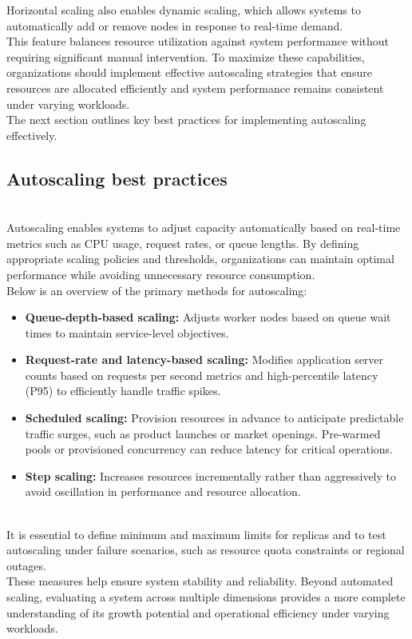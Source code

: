 Horizontal scaling also enables dynamic scaling, which allows systems to automatically add or remove nodes in response to real-time demand.
\\
This feature balances resource utilization against system performance without requiring significant manual intervention. To maximize these capabilities, organizations should implement effective autoscaling strategies that ensure resources are allocated efficiently and system performance remains consistent under varying workloads.
\\
The next section outlines key best practices for implementing autoscaling effectively.

\subsection{Autoscaling best practices}\label{I4sZZ8kBYxMbLYIXHe7vn}
\\
Autoscaling enables systems to adjust capacity automatically based on real-time metrics such as CPU usage, request rates, or queue lengths. By defining appropriate scaling policies and thresholds, organizations can maintain optimal performance while avoiding unnecessary resource consumption.
\\
Below is an overview of the primary methods for autoscaling:

\begin{itemize}
\item
\protect{}\label{-AzSD2Va1lYAzdiMYpYSm}
\textbf{Queue-depth-based scaling:} Adjusts worker nodes based on queue wait times to maintain service-level objectives.
\item
\protect{}\label{sEG7ebtl1KaE9qMfU5MTY}
\textbf{Request-rate and latency-based scaling:} Modifies application server counts based on requests per second metrics and high-percentile latency (P95) to efficiently handle traffic spikes.
\item
\protect{}\label{P-Ie-fPvpDvRiKejzduAx}
\textbf{Scheduled scaling:} Provision resources in advance to anticipate predictable traffic surges, such as product launches or market openings. Pre-warmed pools or provisioned concurrency can reduce latency for critical operations.
\item
\protect{}\label{l3vmEF-imlcs3h-IAkAvq}
\textbf{Step scaling:} Increases resources incrementally rather than aggressively to avoid oscillation in performance and resource allocation.
\end{itemize}
\\
It is essential to define minimum and maximum limits for replicas and to test autoscaling under failure scenarios, such as resource quota constraints or regional outages.
\\
These measures help ensure system stability and reliability. Beyond automated scaling, evaluating a system across multiple dimensions provides a more complete understanding of its growth potential and operational efficiency under varying workloads.

